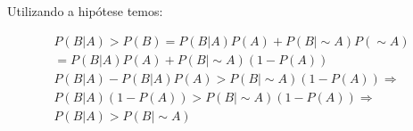 \item

Utilizando a hipótese temos:

\[\begin{array}{l}
P(B|A) > P(B) = P(B|A)P(A) + P(B|\sim A)P(\sim A)\\
 = P(B|A)P(A) + P(B|\sim A)(1 - P(A))\\
P(B|A) - P(B|A)P(A) > P(B|\sim A)(1 - P(A)) \Rightarrow \\
P(B|A)(1 - P(A)) > P(B|\sim A)(1 - P(A)) \Rightarrow \\
P(B|A) > P(B|\sim A)
\end{array}\]

